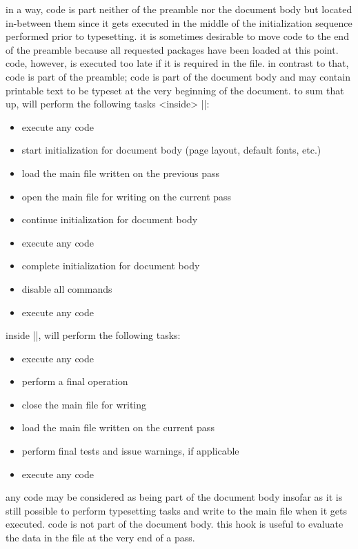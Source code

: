 in a way,  code is part neither of the preamble nor the document body but located in-between them since it gets executed in the middle of the initialization sequence performed prior to typesetting. it is sometimes desirable to move code to the end of the preamble because all requested packages have been loaded at this point.  code, however, is executed too late if it is required in the  file. in contrast to that,  code is part of the preamble;  code is part of the document body and may contain printable text to be typeset at the very beginning of the document. to sum that up, \latex will perform the following tasks <inside> ||:

\begin{itemize}
\setlength{\itemsep}{0pt}
\item execute any  code
\item start initialization for document body (page layout, default fonts, etc.)
\item load the main  file written on the previous \latex pass
\item open the main  file for writing on the current pass
\item continue initialization for document body
\item execute any  code
\item complete initialization for document body
\item disable all  commands
\item execute any  code
\end{itemize}
%
inside ||, \latex will perform the following tasks:

\begin{itemize}
\setlength{\itemsep}{0pt}
\item execute any  code
\item perform a final  operation
\item close the main  file for writing
\item load the main  file written on the current \latex pass
\item perform final tests and issue warnings, if applicable
\item execute any  code
\end{itemize}
%
any  code may be considered as being part of the document body insofar as it is still possible to perform typesetting tasks and write to the main  file when it gets executed.  code is not part of the document body. this hook is useful to evaluate the data in the  file at the very end of a \latex pass.

